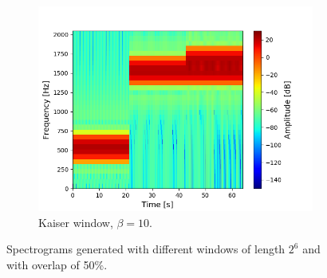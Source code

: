 \begin{figure}[H]
\begin{subfigure}{0.49\textwidth}
\includegraphics[width=\textwidth]{figures/stft_windows/100/kaiser_10.png}
\caption{Kaiser window, $\beta=10$.}
\label{fig:stft_kaiser_100_10}
\end{subfigure}
\caption{Spectrograms generated with different windows of length $2^6$ and with overlap of 50\%.}
\label{fig:stft_windows_100}
\end{figure}
